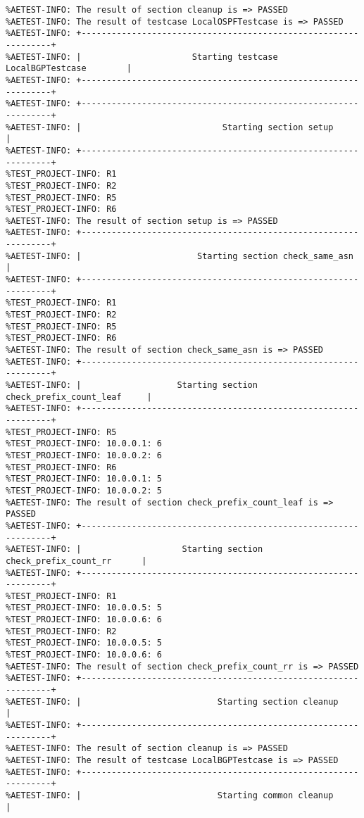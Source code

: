 \begin{verbatim}
%AETEST-INFO: The result of section cleanup is => PASSED
%AETEST-INFO: The result of testcase LocalOSPFTestcase is => PASSED
%AETEST-INFO: +----------------------------------------------------------------+
%AETEST-INFO: |                      Starting testcase LocalBGPTestcase        |
%AETEST-INFO: +----------------------------------------------------------------+
%AETEST-INFO: +----------------------------------------------------------------+
%AETEST-INFO: |                            Starting section setup              |
%AETEST-INFO: +----------------------------------------------------------------+
%TEST_PROJECT-INFO: R1
%TEST_PROJECT-INFO: R2
%TEST_PROJECT-INFO: R5
%TEST_PROJECT-INFO: R6
%AETEST-INFO: The result of section setup is => PASSED
%AETEST-INFO: +----------------------------------------------------------------+
%AETEST-INFO: |                       Starting section check_same_asn          |
%AETEST-INFO: +----------------------------------------------------------------+
%TEST_PROJECT-INFO: R1
%TEST_PROJECT-INFO: R2
%TEST_PROJECT-INFO: R5
%TEST_PROJECT-INFO: R6
%AETEST-INFO: The result of section check_same_asn is => PASSED
%AETEST-INFO: +----------------------------------------------------------------+
%AETEST-INFO: |                   Starting section check_prefix_count_leaf     |
%AETEST-INFO: +----------------------------------------------------------------+
%TEST_PROJECT-INFO: R5
%TEST_PROJECT-INFO: 10.0.0.1: 6
%TEST_PROJECT-INFO: 10.0.0.2: 6
%TEST_PROJECT-INFO: R6
%TEST_PROJECT-INFO: 10.0.0.1: 5
%TEST_PROJECT-INFO: 10.0.0.2: 5
%AETEST-INFO: The result of section check_prefix_count_leaf is => PASSED
%AETEST-INFO: +----------------------------------------------------------------+
%AETEST-INFO: |                    Starting section check_prefix_count_rr      |
%AETEST-INFO: +----------------------------------------------------------------+
%TEST_PROJECT-INFO: R1
%TEST_PROJECT-INFO: 10.0.0.5: 5
%TEST_PROJECT-INFO: 10.0.0.6: 6
%TEST_PROJECT-INFO: R2
%TEST_PROJECT-INFO: 10.0.0.5: 5
%TEST_PROJECT-INFO: 10.0.0.6: 6
%AETEST-INFO: The result of section check_prefix_count_rr is => PASSED
%AETEST-INFO: +----------------------------------------------------------------+
%AETEST-INFO: |                           Starting section cleanup             |
%AETEST-INFO: +----------------------------------------------------------------+
%AETEST-INFO: The result of section cleanup is => PASSED
%AETEST-INFO: The result of testcase LocalBGPTestcase is => PASSED
%AETEST-INFO: +----------------------------------------------------------------+
%AETEST-INFO: |                           Starting common cleanup              |

\end{verbatim}
